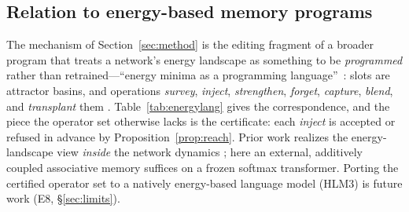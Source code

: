 \documentclass[11pt]{article}
\theoremstyle{remark}
\begin{document}
\subsection{Relation to energy-based memory programs}
\label{sec:energyops}

The mechanism of Section~\ref{sec:method} is the editing fragment of a broader
program that treats a network's energy landscape as something to be
\emph{programmed} rather than retrained---``energy minima as a programming
language''~\citep{qriton2026hlm}: slots are attractor basins, and operations
\emph{survey}, \emph{inject}, \emph{strengthen}, \emph{forget}, \emph{capture},
\emph{blend}, and \emph{transplant} them \citep{qriton2026energylang}.
Table~\ref{tab:energylang} gives the correspondence, and the piece the operator
set otherwise lacks is the certificate: each \emph{inject} is accepted or refused
in advance by Proposition~\ref{prop:reach}. Prior work realizes the
energy-landscape view \emph{inside} the network dynamics
\citep{krotov2016dense, ramsauer2020hopfield, hoover2023energy}; here an
external, additively coupled associative memory suffices on a frozen softmax
transformer. Porting the certified operator set to a natively energy-based
language model (HLM3) is future work (E8, \S\ref{sec:limits}).

\begin{table}[t]
\centering\small
{}
\caption{HLM5 as the \emph{certified} fragment of the energy-language operator set.
The first two rows and the guard carry a-priori guarantees; capture/blend/transplant
are validated only operationally (Table~\ref{tab:energyops}).}
\label{tab:energylang}
\end{table}
\end{document}
